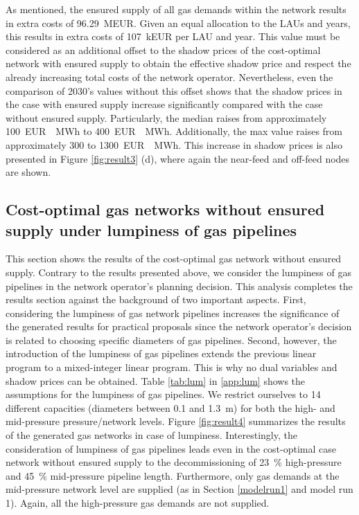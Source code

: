 As mentioned, the ensured supply of all gas demands within the network results in extra costs of \SI{96.29}{MEUR}. Given an equal allocation to the LAUs and years, this results in extra costs of \SI{107}{kEUR} per LAU and year. This value must be considered as an additional offset to the shadow prices of the cost-optimal network with ensured supply to obtain the effective shadow price and respect the already increasing total costs of the network operator. Nevertheless, even the comparison of 2030's values without this offset shows that the shadow prices in the case with ensured supply increase significantly compared with the case without ensured supply. Particularly, the median raises from approximately \SI{100}{EUR \per MWh} to \SI{400}{EUR \per MWh}. Additionally, the max value raises from approximately \SI{300}{} to \SI{1300}{EUR \per MWh}. This increase in shadow prices is also presented in Figure \ref{fig:result3} (d), where again the near-feed and off-feed nodes are shown. 

\subsection{Cost-optimal gas networks without ensured supply under lumpiness of gas pipelines}\label{res:lum}
This section shows the results of the cost-optimal gas network without ensured supply. Contrary to the results presented above, we consider the lumpiness of gas pipelines in the network operator's planning decision. This analysis completes the results section against the background of two important aspects. First, considering the lumpiness of gas network pipelines increases the significance of the generated results for practical proposals since the network operator's decision is related to choosing specific diameters of gas pipelines. Second, however, the introduction of the lumpiness of gas pipelines extends the previous linear program to a mixed-integer linear program. This is why no dual variables and shadow prices can be obtained. Table \ref{tab:lum} in \ref{app:lum} shows the assumptions for the lumpiness of gas pipelines. We restrict ourselves to 14 different capacities (diameters between 0.1 and \SI{1.3}{\meter}) for both the high- and mid-pressure pressure/network levels. Figure \ref{fig:result4} summarizes the results of the generated gas networks in case of lumpiness. Interestingly, the consideration of lumpiness of gas pipelines leads even in the cost-optimal case network without ensured supply to the decommissioning of \SI{23}{\%} high-pressure and \SI{45}{\%} mid-pressure pipeline length. Furthermore, only gas demands at the mid-pressure network level are supplied (as in Section \ref{modelrun1} and model run 1). Again, all the high-pressure gas demands are not supplied. 


